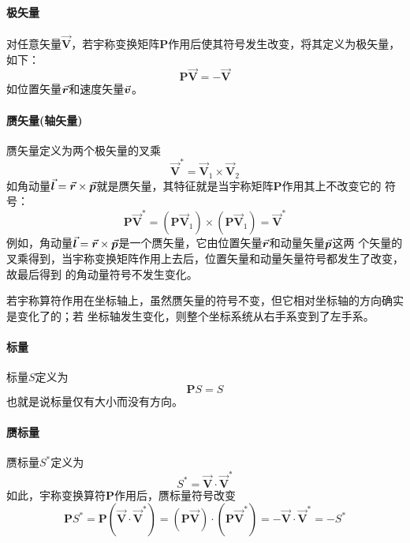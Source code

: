 \paragraph*{极矢量}
对任意矢量$\vec{\bm{V}}$，若宇称变换矩阵$\bm{P}$作用后使其符号发生改变，将其定义为极矢量，如下：
\begin{equation}
    \bm{P} \vec{\bm{V}} = -\vec{\bm{V}}
    \label{eq:polar-vector}
\end{equation}
如位置矢量$\vec{\bm{r}}$和速度矢量$\vec{\bm{v}}$。

\paragraph*{赝矢量(轴矢量)}
赝矢量定义为两个极矢量的叉乘
\begin{equation}
    \vec{\bm{V}}^{\ast} = \vec{\bm{V}}_1 \times \vec{\bm{V}}_2
    \label{eq:pesudovectors-def}
\end{equation}
如角动量$\vec{\bm{l}} = \vec{\bm{r}} \times \vec{\bm{p}}$就是赝矢量，其特征就是当宇称矩阵$\bm{P}$作用其上不改变它的
符号：
\begin{equation}
    \bm{P} \vec{\bm{V}}^{\ast} = (\bm{P} \vec{\bm{V}}_1) \times (\bm{P} \vec{\bm{V}}_1) = \vec{\bm{V}}^{\ast}
    \label{eq:pesudovec-parity}
\end{equation}
例如，角动量$\vec{\bm{l}} = \vec{\bm{r}} \times \vec{\bm{p}}$是一个赝矢量，它由位置矢量$\vec{\bm{r}}$和动量矢量$\vec{\bm{p}}$这两
个矢量的叉乘得到，当宇称变换矩阵作用上去后，位置矢量和动量矢量符号都发生了改变，故最后得到
的角动量符号不发生变化。
\begin{note}
    若宇称算符作用在坐标轴上，虽然赝矢量的符号不变，但它相对坐标轴的方向确实是变化了的；若
    坐标轴发生变化，则整个坐标系统从右手系变到了左手系。
\end{note}

\paragraph*{标量}
标量$S$定义为
\begin{equation}
    \bm{P} S = S
    \label{eq:scalar-def}
\end{equation}
也就是说标量仅有大小而没有方向。

\paragraph*{赝标量}
赝标量$S^{\ast}$定义为
\begin{equation}
    S^{\ast} = \vec{\bm{V}} \cdot \vec{\bm{V}}^{\ast}
    \label{eq:pseudoscalar-def}
\end{equation}
如此，宇称变换算符$\bm{P}$作用后，赝标量符号改变
\begin{equation}
    \bm{P} S^{\ast} = \bm{P} (\vec{\bm{V}} \cdot \vec{\bm{V}}^{\ast}) = (\bm{P} \vec{\bm{V}}) \cdot (\bm{P}\vec{\bm{V}}^{\ast})
                  = -\vec{\bm{V}} \cdot \vec{\bm{V}}^{\ast} = -S^{\ast}
    \label{eq:pseudoscalar-prop1}
\end{equation}


